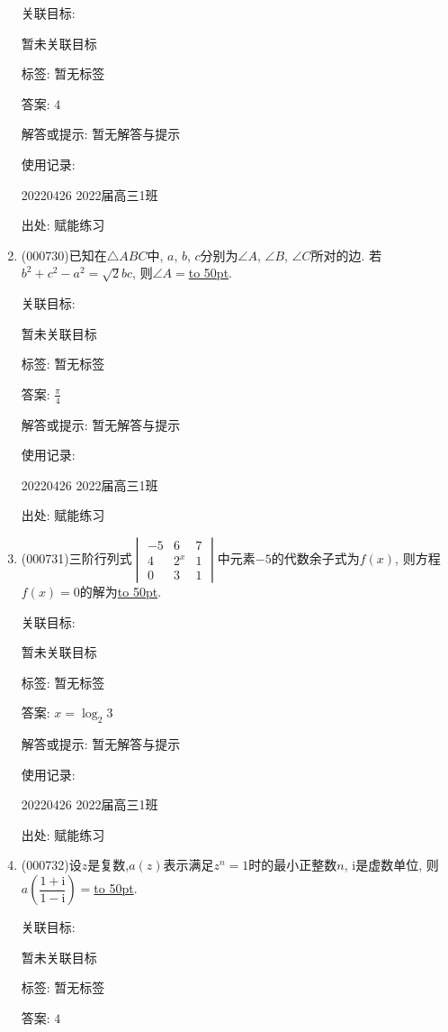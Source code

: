 \documentclass[10pt,a4paper]{article}
\newcommand{\blank}[1]{\underline{\hbox to #1pt{}}}
\begin{document}
\begin{enumerate}[1.]
关联目标:

暂未关联目标



标签: 暂无标签

答案: $4$

解答或提示: 暂无解答与提示

使用记录:

20220426	2022届高三1班	


出处: 赋能练习
\item { (000730)}已知在$\triangle ABC$中, $a$, $b$, $c$分别为$\angle A$, $\angle B$, $\angle C$所对的边. 若$b^2+c^2-a^2=\sqrt{2}bc$, 则$\angle A=$\blank{50}.


关联目标:

暂未关联目标



标签: 暂无标签

答案: $\frac{\pi}4$

解答或提示: 暂无解答与提示

使用记录:

20220426	2022届高三1班	


出处: 赋能练习
\item { (000731)}三阶行列式$\begin{vmatrix}-5 & 6 & 7  \\ 4 & 2^x & 1  \\ 0 & 3 & 1  \end{vmatrix}$中元素$-5$的代数余子式为$f(x)$, 则方程$f(x)=0$的解为\blank{50}.


关联目标:

暂未关联目标



标签: 暂无标签

答案: $x=\log_2 3$

解答或提示: 暂无解答与提示

使用记录:

20220426	2022届高三1班	


出处: 赋能练习
\item { (000732)}设$z$是复数,$a(z)$表示满足$z^n=1$时的最小正整数$n$, $\mathrm{i}$是虚数单位, 则$a(\dfrac{1+\mathrm{i}}{1-\mathrm{i}})=$\blank{50}.


关联目标:

暂未关联目标



标签: 暂无标签

答案: $4$


\end{enumerate}
\end{document}
